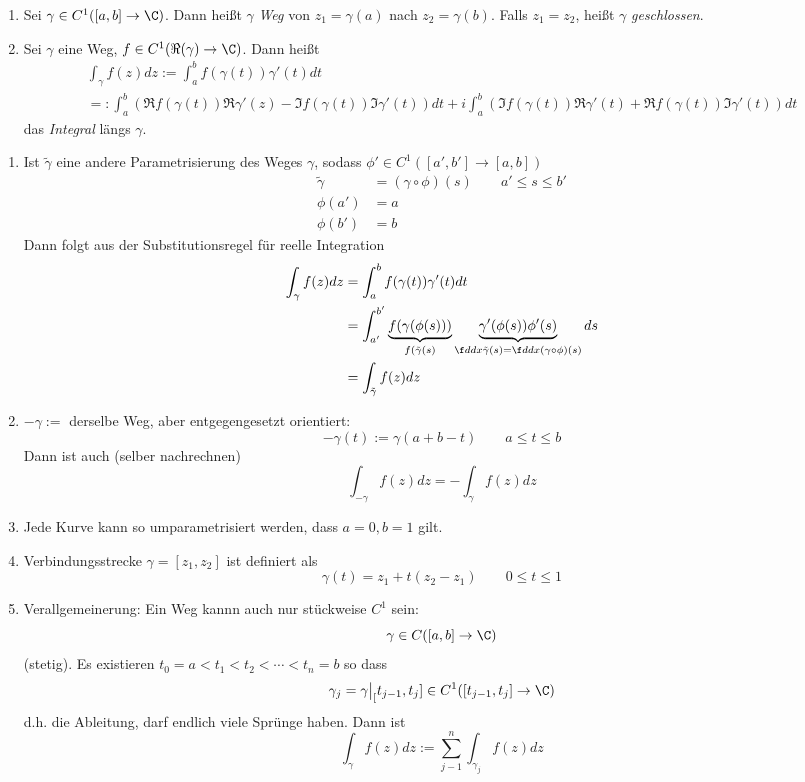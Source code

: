 \documentclass[a4paper,10pt]{scrartcl}
\begin{document}
\begin{df}
	\begin{enumerate}[1)]
		\item 
			Sei $\gamma\in C^1([a,b]\to \C)$.
			Dann heißt $\gamma$ \emph{Weg} von $z_1=\gamma(a)$ nach $z_2=\gamma(b)$.
			Falls $z_1=z_2$, heißt $\gamma$ \emph{geschlossen}.
		\item
			Sei $\gamma$ eine Weg, $f\in C^1(\Re(\gamma)\to \C)$.
			Dann heißt
			\begin{align*}
				\int_\gamma f(z) dz := \int_a^b f(\gamma(t)) \gamma'(t) dt\\
				=: \int_a^b(\Re f(\gamma(t)) \Re \gamma'(z) - \Im f(\gamma(t)) \Im \gamma'(t))dt
				+ i\int_a^b(\Im f(\gamma(t)) \Re \gamma'(t) + \Re f(\gamma(t)) \Im \gamma'(t))dt
			\end{align*}
			das \emph{Integral} längs $\gamma$.
	\end{enumerate}
\end{df}

\begin{nt}
	\label{st:1.28}
	\begin{enumerate}[1)]
		\item 
			Ist $\tilde \gamma$ eine andere Parametrisierung des Weges $\gamma$, sodass $\phi'\in C^1([a',b']\to [a,b])$
			\begin{align*}
				\tilde \gamma &= (\gamma \circ \phi)(s) \qquad a'\le s\le b'\\
				\phi(a') &= a\\
				\phi(b') &= b
			\end{align*}
			Dann folgt aus der Substitutionsregel für reelle Integration
			\begin{align*}
				\int_\gamma f(z) dz &= \int_a^b f(\gamma(t)) \gamma'(t) dt \\
				&= \int_{a'}^{b'} \underbrace{f(\gamma(\phi(s)))}_{f(\tilde \gamma(s)} \underbrace{\gamma'(\phi(s))\phi'(s)}_{\f d{dx}\tilde \gamma(s)=\f d{dx}(\gamma\circ \phi)(s)} ds\\
				&= \int_{\tilde \gamma} f(z) dz
			\end{align*}
		\item
			$-\gamma := $  derselbe Weg, aber entgegengesetzt orientiert:
			\[
				-\gamma(t) := \gamma(a+b-t) \qquad a\le t\le b
			\]
			Dann ist auch (selber nachrechnen)
			\[
				\int_{-\gamma}f(z) dz = - \int_\gamma f(z) dz
			\]
		\item
			Jede Kurve kann so umparametrisiert werden, dass $a=0, b=1$ gilt.
		\item
			Verbindungsstrecke $\gamma=[z_1,z_2]$ ist definiert als
			\[
				\gamma(t) = z_1 + t(z_2-z_1) \qquad 0\le t\le 1
			\]
		\item
			Verallgemeinerung: Ein Weg kannn auch nur stückweise $C^1$ sein:
			\[
				\gamma\in C([a,b]\to \C)
			\]
			(stetig).
			Es existieren $t_0=a<t_1<t_2<\dotsb<t_n=b$ so dass
			\[
				\gamma_j = \gamma\big|_[t_{j-1},t_j] \in C^1([t_{j-1},t_j]\to \C)
			\]
			d.h. die Ableitung, darf endlich viele Sprünge haben.
			Dann ist
			\[
				\int_\gamma f(z) dz := \sum_{j-1}^n \int_{\gamma_j}f(z) dz
			\]
	\end{enumerate}
\end{nt}
\end{document}
